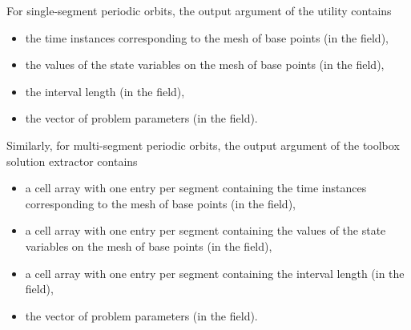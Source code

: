 For single-segment periodic orbits,  the  output argument of the  utility contains
\begin{itemize}
\item the time instances corresponding to the mesh of base points (in the  field),
\item the values of the state variables on the mesh of base points (in the  field),
\item the interval length (in the  field),
\item the vector of problem parameters (in the  field).
\end{itemize}
Similarly, for multi-segment periodic orbits, the  output argument of the toolbox solution extractor  contains
\begin{itemize}
\item a cell array with one entry per segment containing the time instances corresponding to the mesh of base points (in the  field),
\item a cell array with one entry per segment containing the values of the state variables on the mesh of base points (in the  field),
\item a cell array with one entry per segment containing the interval length (in the  field),
\item the vector of problem parameters (in the  field).
\end{itemize}

